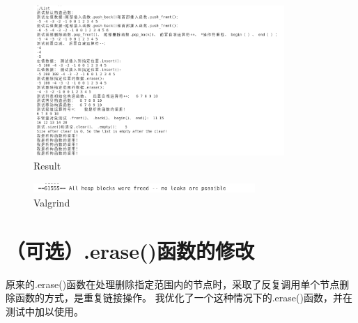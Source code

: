 \documentclass[UTF8]{ctexart}
\begin{document}
\begin{figure}[h]
    \centering
    \includegraphics[width=0.85\textwidth]{result.png} %
    \caption{Result}

\end{figure}

\begin{figure}[h]
    \centering
    \includegraphics[width=0.75\textwidth]{valgrind.png} %
    \caption{Valgrind}
\end{figure}

\section{（可选）.erase()函数的修改}
原来的.erase()函数在处理删除指定范围内的节点时，采取了反复调用单个节点删除函数的方式，是重复链接操作。
我优化了一个这种情况下的.erase()函数，并在测试中加以使用。
\end{document}
